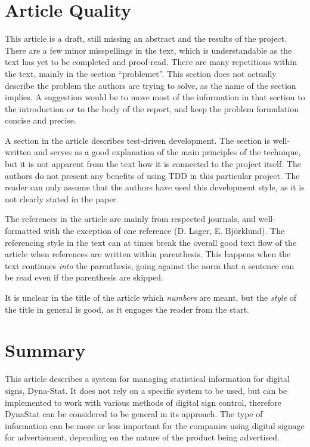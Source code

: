 \documentclass[a4paper,10pt]{article}
\begin{document}
\section{Article Quality}
This article is a draft, still missing an abstract and the results of the project. There are a few minor misspellings in the text, which is understandable as the text has yet to be completed and proof-read. There are many repetitions within the text, mainly in the section ``problemet''. This section does not actually describe the problem the authors are trying to solve, as the name of the section implies. A suggestion would be to move most of the information in that section to the introduction or to the body of the report, and keep the problem formulation concise and precise.

A section in the article describes test-driven development. The section is well-written and serves as a good explanation of the main principles of the technique, but it is not apparent from the text how it is connected to the project itself. The authors do not present any benefits of using TDD in this particular project. The reader can only assume that the authors have used this development style, as it is not clearly stated in the paper.

The references in the article are mainly from respected journals, and well-formatted with the exception of one reference (D. Lager, E. Björklund). The referencing style in the text can at times break the overall good text flow of the article when references are written within parenthesis. This happens when the text continues \emph{into} the parenthesis, going against the norm that a sentence can be read even if the parenthesis are skipped.

It is unclear in the title of the article which \emph{numbers} are meant, but the \emph{style} of the title in general is good, as it engages the reader from the start.


\section{Summary}
This article describes a system for managing statistical information for digital signs, Dyna-Stat. It does not rely on a specific system to be used, but can be implemented to work with various methods of digital sign control, therefore DynaStat can be considered to be general in its approach. The type of information can be more or less important for the companies using digital signage for advertisment, depending on the nature of the product being advertised.
\end{document}
